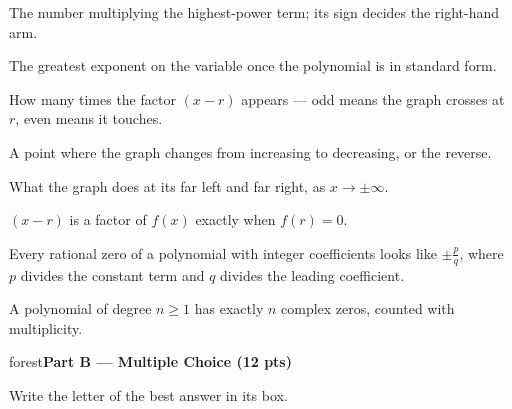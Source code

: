 \documentclass[10pt]{article}
\newcommand{\parthead}[1]{%
  \vspace{6pt}\noindent
  \begin{headlinebox}{forest}\color{white}\bfseries #1\end{headlinebox}%
  \vspace{4pt}}
\begin{document}
\begin{minipage}[t]{0.57\textwidth}
\small
\begin{description}[leftmargin=1.4em, itemsep=3pt]
  \item[(A)] The number multiplying the highest-power term; its sign decides the right-hand arm.
  \item[(B)] The greatest exponent on the variable once the polynomial is in standard form.
  \item[(C)] How many times the factor $(x-r)$ appears --- odd means the graph crosses at $r$, even means it touches.
  \item[(D)] A point where the graph changes from increasing to decreasing, or the reverse.
  \item[(E)] What the graph does at its far left and far right, as $x\to\pm\infty$.
  \item[(F)] $(x-r)$ is a factor of $f(x)$ exactly when $f(r)=0$.
  \item[(G)] Every rational zero of a polynomial with integer coefficients looks like $\pm\frac{p}{q}$, where $p$ divides the constant term and $q$ divides the leading coefficient.
  \item[(H)] A polynomial of degree $n\ge 1$ has exactly $n$ complex zeros, counted with multiplicity.
\end{description}
\end{minipage}

\parthead{Part B --- Multiple Choice (12 pts)}
Write the letter of the best answer in its box.
\end{document}
